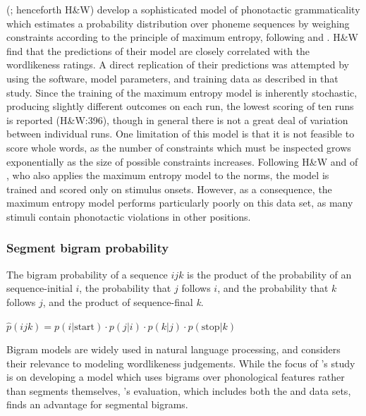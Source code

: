 \citeauthor{Hayes2008a} (\citeyear{Hayes2008a}; henceforth H\&W) develop a sophisticated model of phonotactic grammaticality which estimates a probability distribution over phoneme sequences by weighing constraints according to the principle of maximum entropy, following \citet{Goldwater2003} and \citet{Jager2007}. H\&W find that the predictions of their model are closely correlated with the \citet{Scholes1966} wordlikeness ratings. A direct replication of their predictions was attempted by using the software, model parameters, and training data as described in that study. Since the training of the maximum entropy model is inherently stochastic, producing slightly different outcomes on each run, the lowest scoring of ten runs is reported (H\&W:396), though in general there is not a great deal of variation between individual runs. One limitation of this model is that it is not feasible to score whole words, as the number of constraints which must be inspected grows exponentially as the size of possible constraints increases. Following H\&W and of \citet{Albright2009a}, who also applies the maximum entropy model to the \citet{Albright2003b} norms, the model is trained and scored only on stimulus onsets. However, as a consequence, the maximum entropy model performs particularly poorly on this data set, as many stimuli contain phonotactic violations in other positions.

\subsubsection{Segment bigram probability} \label{bigram}

The bigram probability of a sequence $ijk$ is the product of the probability of an sequence-initial $i$, the probability that $j$ follows $i$, and the probability that $k$ follows $j$, and the product of sequence-final \emph{k}.

\begin{unlabeledexample}
$\displaystyle \hat{p}(ijk) = p(i|\textrm{start}) \cdot p(j|i) \cdot p(k|j) \cdot p(\textrm{stop}|k)$
\end{unlabeledexample}

\noindent Bigram models are widely used in natural language processing, and \citet{Albright2009a} considers their relevance to modeling wordlikeness judgements. While the focus of \citeauthor{Albright2009a}'s study is on developing a model which uses bigrams over phonological features rather than segments themselves, \citeauthor{Albright2009a}'s evaluation, which includes both the \citeauthor{Scholes1966} and \citeauthor{Albright2003b} data sets, finds an advantage for segmental bigrams. 

